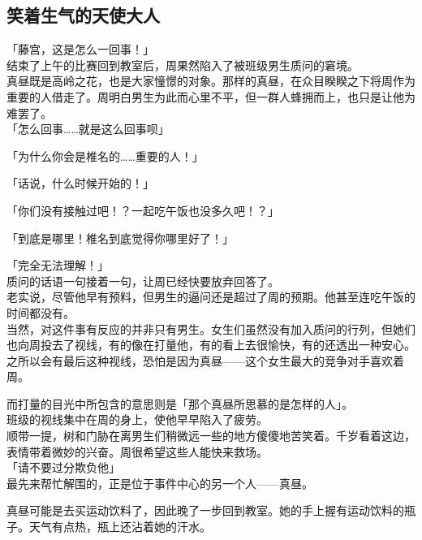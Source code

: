 \subsection{笑着生气的天使大人}

「藤宫，这是怎么一回事！」\\

结束了上午的比赛回到教室后，周果然陷入了被班级男生质问的窘境。\\

真昼既是高岭之花，也是大家憧憬的对象。那样的真昼，在众目睽睽之下将周作为重要的人借走了。周明白男生为此而心里不平，但一群人蜂拥而上，也只是让他为难罢了。\\

「怎么回事……就是这么回事呗」

「为什么你会是椎名的……重要的人！」

「话说，什么时候开始的！」

「你们没有接触过吧！？一起吃午饭也没多久吧！？」

「到底是哪里！椎名到底觉得你哪里好了！」

「完全无法理解！」\\

质问的话语一句接着一句，让周已经快要放弃回答了。\\

老实说，尽管他早有预料，但男生的逼问还是超过了周的预期。他甚至连吃午饭的时间都没有。\\

当然，对这件事有反应的并非只有男生。女生们虽然没有加入质问的行列，但她们也向周投去了视线，有的像在打量他，有的看上去很愉快，有的还透出一种安心。\\

之所以会有最后这种视线，恐怕是因为真昼——这个女生最大的竞争对手喜欢着周。

而打量的目光中所包含的意思则是「那个真昼所思慕的是怎样的人」。\\

班级的视线集中在周的身上，使他早早陷入了疲劳。\\

顺带一提，树和门胁在离男生们稍微远一些的地方傻傻地苦笑着。千岁看着这边，表情带着微妙的兴奋。周很希望这些人能快来救场。\\

「请不要过分欺负他」\\

最先来帮忙解围的，正是位于事件中心的另一个人——真昼。

真昼可能是去买运动饮料了，因此晚了一步回到教室。她的手上握有运动饮料的瓶子。天气有点热，瓶上还沾着她的汗水。\\

